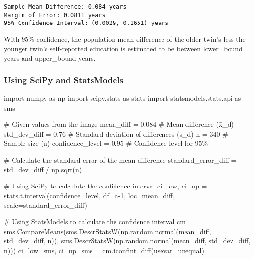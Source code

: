 \documentclass[
  letterpaper,
  DIV=11,
  numbers=noendperiod]{scrartcl}
\newenvironment{Shaded}{\begin{snugshade}}{\end{snugshade}}
\newcommand{\CommentTok}[1]{\textcolor[rgb]{0.37,0.37,0.37}{#1}}
\newcommand{\DecValTok}[1]{\textcolor[rgb]{0.68,0.00,0.00}{#1}}
\newcommand{\FloatTok}[1]{\textcolor[rgb]{0.68,0.00,0.00}{#1}}
\newcommand{\ImportTok}[1]{\textcolor[rgb]{0.00,0.46,0.62}{#1}}
\newcommand{\NormalTok}[1]{\textcolor[rgb]{0.00,0.23,0.31}{#1}}
\newcommand{\OperatorTok}[1]{\textcolor[rgb]{0.37,0.37,0.37}{#1}}
\newcommand{\StringTok}[1]{\textcolor[rgb]{0.13,0.47,0.30}{#1}}
\begin{document}
\begin{verbatim}
Sample Mean Difference: 0.084 years
Margin of Error: 0.0811 years
95% Confidence Interval: (0.0029, 0.1651) years
\end{verbatim}

With 95\% confidence, the population mean difference of the older twin's
less the younger twin's self-reported education is estimated to be
between lower\_bound years and upper\_bound years.

\hypertarget{using-scipy-and-statsmodels}{%
\subsubsection{Using SciPy and
StatsModels}\label{using-scipy-and-statsmodels}}

\begin{Shaded}
\begin{Highlighting}[]
\ImportTok{import}\NormalTok{ numpy }\ImportTok{as}\NormalTok{ np}
\ImportTok{import}\NormalTok{ scipy.stats }\ImportTok{as}\NormalTok{ stats}
\ImportTok{import}\NormalTok{ statsmodels.stats.api }\ImportTok{as}\NormalTok{ sms}

\CommentTok{\# Given values from the image}
\NormalTok{mean\_diff }\OperatorTok{=} \FloatTok{0.084}  \CommentTok{\# Mean difference (x̄\_d)}
\NormalTok{std\_dev\_diff }\OperatorTok{=} \FloatTok{0.76}  \CommentTok{\# Standard deviation of differences (s\_d)}
\NormalTok{n }\OperatorTok{=} \DecValTok{340}  \CommentTok{\# Sample size (n)}
\NormalTok{confidence\_level }\OperatorTok{=} \FloatTok{0.95}  \CommentTok{\# Confidence level for 95\%}

\CommentTok{\# Calculate the standard error of the mean difference}
\NormalTok{standard\_error\_diff }\OperatorTok{=}\NormalTok{ std\_dev\_diff }\OperatorTok{/}\NormalTok{ np.sqrt(n)}

\CommentTok{\# Using SciPy to calculate the confidence interval}
\NormalTok{ci\_low, ci\_up }\OperatorTok{=}\NormalTok{ stats.t.interval(confidence\_level, df}\OperatorTok{=}\NormalTok{n}\OperatorTok{{-}}\DecValTok{1}\NormalTok{, loc}\OperatorTok{=}\NormalTok{mean\_diff, scale}\OperatorTok{=}\NormalTok{standard\_error\_diff)}

\CommentTok{\# Using StatsModels to calculate the confidence interval}
\NormalTok{cm }\OperatorTok{=}\NormalTok{ sms.CompareMeans(sms.DescrStatsW(np.random.normal(mean\_diff, std\_dev\_diff, n)), }
\NormalTok{                      sms.DescrStatsW(np.random.normal(mean\_diff, std\_dev\_diff, n)))}
\NormalTok{ci\_low\_sms, ci\_up\_sms }\OperatorTok{=}\NormalTok{ cm.tconfint\_diff(usevar}\OperatorTok{=}\StringTok{\textquotesingle{}unequal\textquotesingle{}}\NormalTok{)}


\end{Highlighting}
\end{Shaded}
\end{document}
